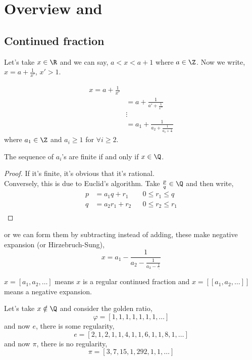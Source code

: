 \documentclass{article}
\begin{document}
  \maketitle

\section{Overview and }
\subsection{Continued fraction}
Let's take $x \in \R$ and we can say, $a < x < a + 1$ where $a \in \Z$. Now we write, $x = a + \frac{1}{x'}$, $x' > 1$.

\begin{align*}
  x = a + \frac{1}{x'} \\
  &= a + \frac{1}{a' + \frac{1}{x''}}\\
  &\vdots\\
  &= a_1 + \frac{1}{a_2 + \frac{1}{a_3 + \frac{1}{\ddots}}}
\end{align*}
where $a_1 \in \Z$ and $a_i \ge 1$ for $\forall i \ge 2$. \\

\begin{nlemma}
  The sequence of $a_i$'s are finite if and only if $x \in \Q$.
\end{nlemma}
\begin{proof}
  If it's finite, it's obvious that it's rational.\\
  Conversely, this is due to Euclid's algorithm. Take $\frac{p}{q} \in \Q$ and then write,
  \begin{align*}
    p &= a_1q + r_1 && 0 \le r_1 \le q\\
    q &= a_2r_1 + r_2 && 0 \le r_2 \le r_1\\
  \end{align*}
\end{proof}
or we can form them by subtracting instead of adding, these make negative expansion (or Hirzebruch-Sung),
$$ x = a_1 - \frac{1}{a_2 - \frac{1}{a_3 - \frac{1}{\ddots}}} $$

\begin{notation}
 $x = [a_1, a_2, \dots]$ means $x$ is a regular continued fraction and $x = [[a_1, a_2, \dots]]$ means a negative expansion.
\end{notation}

  Let's take $x \notin \Q$ and consider the golden ratio,\\
  $$ \varphi = [1, 1, 1, 1, 1, 1, 1, \dots] $$
  and now $e$, there is some regularity,
  $$ e = [2, 1, 2, 1, 1, 4, 1, 1, 6, 1, 1, 8, 1, \dots] $$
  and now $\pi$, there is no regularity,
  $$ \pi = [3, 7, 15, 1, 292, 1, 1, \dots] $$
\end{document}
